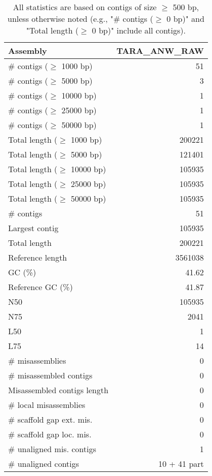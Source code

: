 \documentclass[12pt,a4paper]{article}
\begin{document}
\begin{table}[ht]
\begin{center}
\caption{All statistics are based on contigs of size $\geq$ 500 bp, unless otherwise noted (e.g., "\# contigs ($\geq$ 0 bp)" and "Total length ($\geq$ 0 bp)" include all contigs).}
\begin{tabular}{|l*{1}{|r}|}
\hline
Assembly & TARA\_ANW\_RAW \\ \hline
\# contigs ($\geq$ 1000 bp) & 51 \\ \hline
\# contigs ($\geq$ 5000 bp) & 3 \\ \hline
\# contigs ($\geq$ 10000 bp) & 1 \\ \hline
\# contigs ($\geq$ 25000 bp) & 1 \\ \hline
\# contigs ($\geq$ 50000 bp) & 1 \\ \hline
Total length ($\geq$ 1000 bp) & 200221 \\ \hline
Total length ($\geq$ 5000 bp) & 121401 \\ \hline
Total length ($\geq$ 10000 bp) & 105935 \\ \hline
Total length ($\geq$ 25000 bp) & 105935 \\ \hline
Total length ($\geq$ 50000 bp) & 105935 \\ \hline
\# contigs & 51 \\ \hline
Largest contig & 105935 \\ \hline
Total length & 200221 \\ \hline
Reference length & 3561038 \\ \hline
GC (\%) & 41.62 \\ \hline
Reference GC (\%) & 41.87 \\ \hline
N50 & 105935 \\ \hline
N75 & 2041 \\ \hline
L50 & 1 \\ \hline
L75 & 14 \\ \hline
\# misassemblies & 0 \\ \hline
\# misassembled contigs & 0 \\ \hline
Misassembled contigs length & 0 \\ \hline
\# local misassemblies & 0 \\ \hline
\# scaffold gap ext. mis. & 0 \\ \hline
\# scaffold gap loc. mis. & 0 \\ \hline
\# unaligned mis. contigs & 1 \\ \hline
\# unaligned contigs & 10 + 41 part \\ \hline

\end{tabular}
\end{center}
\end{table}
\end{document}
